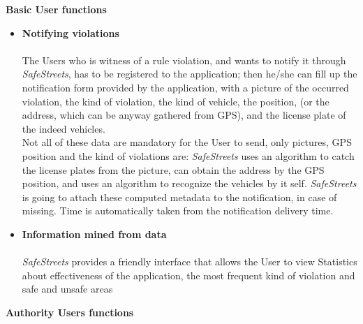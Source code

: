\textbf{Basic User functions} \\
\begin{itemize}
    \item \textbf{Notifying violations}\\\\
    The Users who is witness of a rule violation, and wants to notify it through \textit{SafeStreets}, has to be registered to the application; then he/she can fill up the notification form provided by the application, with a picture of the occurred violation, the kind of violation, the kind of vehicle, the position, (or the address, which can be anyway gathered from GPS), and the license plate of the indeed vehicles.\\
    Not all of these data are mandatory for the User to send, only pictures, GPS position and the kind of violations are: \textit{SafeStreets} uses an algorithm to catch the license plates from the picture, can obtain the address by the GPS position, and uses an algorithm to recognize the vehicles by it self. \textit{SafeStreets} is going to attach these computed metadata to the notification, in case of missing. Time is automatically taken from the notification delivery time.
    
    \item\textbf{Information mined from data}\\\\
    \textit{SafeStreets} provides a friendly interface that allows the User to view Statistics about effectiveness of the application, the most frequent kind of violation and safe and unsafe areas
    
    \end{itemize}  
    
    \textbf{Authority Users functions} \\
    
